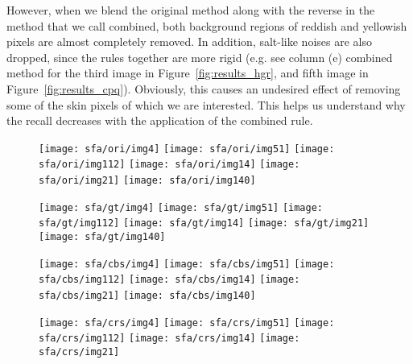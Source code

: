 However, when we blend the original method along with the reverse in the method that we call combined, both background regions of reddish and yellowish pixels are almost completely removed. In addition, salt-like noises are also dropped, since the rules together are more rigid (e.g. see column (e) combined method for the third image in Figure~\ref{fig:results_hgr}, and fifth image in Figure~\ref{fig:results_cpq}). Obviously, this causes an undesired effect of removing some of the skin pixels of which we are interested. This helps us understand why the recall decreases with the application of the combined rule.

\clearpage
\begin{figure*}[!htb]
    \centering
    \begin{subfigure}[t]{0.15\textwidth}
        \texttt{[image: sfa/ori/img4]}
        \texttt{[image: sfa/ori/img51]}
        \texttt{[image: sfa/ori/img112]}
        \texttt{[image: sfa/ori/img14]}
        \texttt{[image: sfa/ori/img21]}
        \texttt{[image: sfa/ori/img140]}
        \caption{}
    \end{subfigure}
    \begin{subfigure}[t]{0.15\textwidth}
        \texttt{[image: sfa/gt/img4]}
        \texttt{[image: sfa/gt/img51]}
        \texttt{[image: sfa/gt/img112]}
        \texttt{[image: sfa/gt/img14]}
        \texttt{[image: sfa/gt/img21]}
        \texttt{[image: sfa/gt/img140]}
        \caption{}
    \end{subfigure}
    \begin{subfigure}[t]{0.15\textwidth}
        \texttt{[image: sfa/cbs/img4]}
        \texttt{[image: sfa/cbs/img51]}
        \texttt{[image: sfa/cbs/img112]}
        \texttt{[image: sfa/cbs/img14]}
        \texttt{[image: sfa/cbs/img21]}
        \texttt{[image: sfa/cbs/img140]}
        \caption{}
    \end{subfigure}
    \begin{subfigure}[t]{0.15\textwidth}
        \texttt{[image: sfa/crs/img4]}
        \texttt{[image: sfa/crs/img51]}
        \texttt{[image: sfa/crs/img112]}
        \texttt{[image: sfa/crs/img14]}
        \texttt{[image: sfa/crs/img21]}

\end{subfigure}
\end{figure*}
